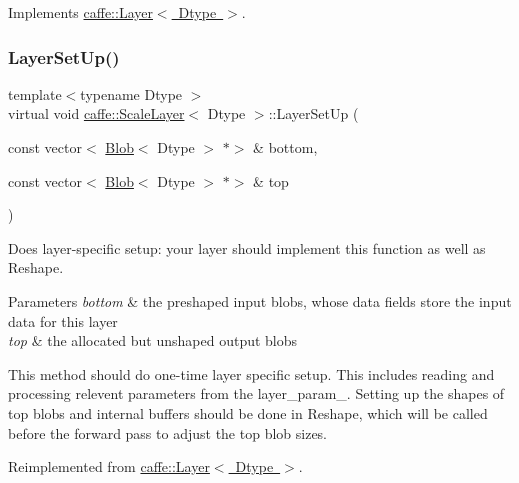 Implements \mbox{\hyperlink{classcaffe_1_1_layer_a576ac6a60b1e99fe383831f52a6cea77}{caffe\+::\+Layer$<$ Dtype $>$}}.

\mbox{\label{classcaffe_1_1_scale_layer_ae3c263f882a7552fe9e88b2d2827cb29}} 
\subsubsection{\texorpdfstring{Layer\+Set\+Up()}{LayerSetUp()}\hspace{0.1cm}{\footnotesize\ttfamily [1/2]}}
{\footnotesize\ttfamily template$<$typename Dtype $>$ \\
virtual void \mbox{\hyperlink{classcaffe_1_1_scale_layer}{caffe\+::\+Scale\+Layer}}$<$ Dtype $>$\+::Layer\+Set\+Up (\begin{DoxyParamCaption}\item[{const vector$<$ \mbox{\hyperlink{classcaffe_1_1_blob}{Blob}}$<$ Dtype $>$ $\ast$$>$ \&}]{bottom,  }\item[{const vector$<$ \mbox{\hyperlink{classcaffe_1_1_blob}{Blob}}$<$ Dtype $>$ $\ast$$>$ \&}]{top }\end{DoxyParamCaption})\hspace{0.3cm}{\ttfamily [virtual]}}



Does layer-\/specific setup\+: your layer should implement this function as well as Reshape. 


\begin{DoxyParams}{Parameters}
{\em bottom} & the preshaped input blobs, whose data fields store the input data for this layer \\
\hline
{\em top} & the allocated but unshaped output blobs\\
\hline
\end{DoxyParams}
This method should do one-\/time layer specific setup. This includes reading and processing relevent parameters from the {\ttfamily layer\+\_\+param\+\_\+}. Setting up the shapes of top blobs and internal buffers should be done in {\ttfamily Reshape}, which will be called before the forward pass to adjust the top blob sizes. 

Reimplemented from \mbox{\hyperlink{classcaffe_1_1_layer_a481323a3e0972c682787f2137468c29f}{caffe\+::\+Layer$<$ Dtype $>$}}.

